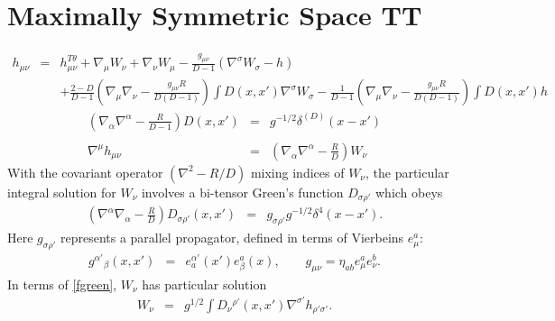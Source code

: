 \documentclass[10pt,letterpaper]{article}
\numberwithin{equation}{section}
\begin{document}
\section{Maximally Symmetric Space TT}
\begin{eqnarray}
h_{\mu\nu} &=& h_{\mu\nu}^{T\theta} + \nabla_\mu W_\nu + \nabla_\nu W_\mu - \frac{g_{\mu\nu}}{D-1}(\nabla^\sigma W_\sigma - h)
\nonumber\\
&& +\frac{2-D}{D-1}\left( \nabla_\mu\nabla_\nu -\frac{ g_{\mu\nu}R}{D(D-1)}\right) \int D(x,x') \nabla^\sigma W_\sigma
-\frac{1}{D-1}\left( \nabla_\mu\nabla_\nu -\frac{g_{\mu\nu}R}{D(D-1)}\right) \int D(x,x') h
\label{decomphmax}
\end{eqnarray}
\begin{eqnarray}
\left( \nabla_\alpha \nabla^\alpha - \frac{R}{D-1}\right)D(x,x') &=& g^{-1/2}\delta^{(D)} (x-x')
\\ \nonumber\\
\nabla^\mu h_{\mu\nu} &=& \left( \nabla_\alpha\nabla^\alpha-\frac{R}{D} \right) W_\nu
\end{eqnarray}
With the covariant operator $(\nabla^2-R/D)$ mixing indices of $W_\nu$, the particular integral solution for $W_\nu$ involves a bi-tensor Green's function $D_{\sigma\rho'}$ which obeys
\begin{eqnarray}
\left( \nabla^\alpha\nabla_\alpha -\frac{R}{D}\right) D_{\sigma\rho'}(x,x') &=& g_{\sigma\rho'}g^{-1/2} \delta^4(x-x').
\label{fgreen}
\end{eqnarray}
Here $g_{\sigma\rho'}$ represents a parallel propagator, defined in terms of Vierbeins $e_\mu^a$:
\begin{eqnarray}
g^{\alpha'}{}_{\beta}(x,x') &=& e^{\alpha'}_a(x') e_{\beta}^a(x),\qquad g_{\mu\nu} = \eta_{ab}e_{\mu}^ae_\nu^b.
\end{eqnarray}
In terms of \eqref{fgreen}, $W_\nu$ has particular solution
\begin{eqnarray}
W_\nu &=& g^{1/2}\int D_\nu{}^{\rho'}(x,x')\nabla^{\sigma'}h_{\rho'\sigma'}.
\end{eqnarray}
%
%



\newpage
\end{document}
